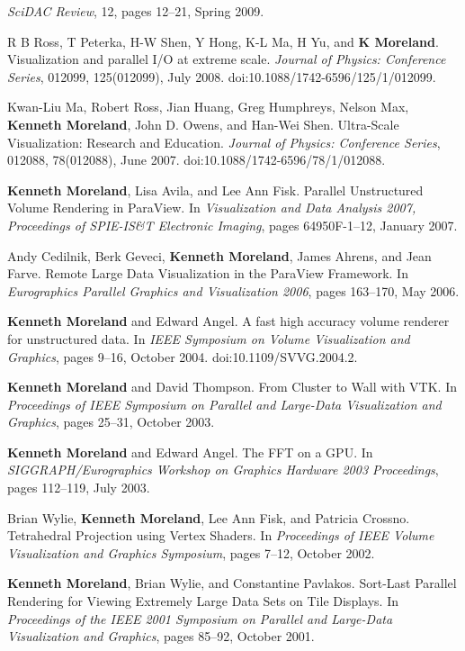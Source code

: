 \begin{enumerate}[label={[\arabic*]}, left=0pt]
  \emph{SciDAC Review}, 12, pages 12--21, Spring 2009.
\item  %
  R B Ross, T Peterka, H-W Shen, Y Hong, K-L Ma, H Yu, and \textbf{K Moreland}.
  Visualization and parallel {I/O} at extreme scale.
  \emph{Journal of Physics: Conference Series}, 012099, 125(012099), July 2008.
  doi:10.1088/1742-6596/125/1/012099.
\item  %
  Kwan-Liu Ma, Robert Ross, Jian Huang, Greg Humphreys, Nelson Max, \textbf{Kenneth Moreland}, John D. Owens, and Han-Wei Shen.
  Ultra-Scale Visualization: Research and Education.
  \emph{Journal of Physics: Conference Series}, 012088, 78(012088), June 2007.
  doi:10.1088/1742-6596/78/1/012088.
\item  %
  \textbf{Kenneth Moreland}, Lisa Avila, and Lee Ann Fisk.
  Parallel Unstructured Volume Rendering in ParaView.
  In \emph{Visualization and Data Analysis 2007, Proceedings of SPIE-IS\&T Electronic Imaging}, pages 64950F-1--12, January 2007.
\item  %
  Andy Cedilnik, Berk Geveci, \textbf{Kenneth Moreland}, James Ahrens, and Jean Farve.
  Remote Large Data Visualization in the {ParaView} Framework.
  In \emph{Eurographics Parallel Graphics and Visualization 2006}, pages 163--170, May 2006.
\item  %
  \textbf{Kenneth Moreland} and Edward Angel.
  A fast high accuracy volume renderer for unstructured data.
  In \emph{IEEE Symposium on Volume Visualization and Graphics}, pages 9--16, October 2004.
  doi:10.1109/SVVG.2004.2.
\item  %
  \textbf{Kenneth Moreland} and David Thompson.
  From Cluster to Wall with {VTK}.
  In \emph{Proceedings of IEEE Symposium on Parallel and Large-Data Visualization and Graphics}, pages 25--31, October 2003.
\item  %
  \textbf{Kenneth Moreland} and Edward Angel.
  {The FFT on a GPU}.
  In \emph{SIGGRAPH/Eurographics Workshop on Graphics Hardware 2003 Proceedings}, pages 112--119, July 2003.
\item  %
  Brian Wylie, \textbf{Kenneth Moreland}, Lee Ann Fisk, and Patricia Crossno.
  Tetrahedral Projection using Vertex Shaders.
  In \emph{Proceedings of IEEE Volume Visualization and Graphics Symposium}, pages 7--12, October 2002.
\item  %
  \textbf{Kenneth Moreland}, Brian Wylie, and Constantine Pavlakos.
  Sort-Last Parallel Rendering for Viewing Extremely Large Data Sets on Tile Displays.
  In \emph{Proceedings of the IEEE 2001 Symposium on Parallel and Large-Data Visualization and Graphics}, pages 85--92, October 2001.
\end{enumerate}